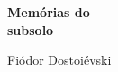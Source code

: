 
\begingroup\thispagestyle{empty}\vspace*{.05\textheight}

              \formular
              \Huge
              \noindent
              \textbf{Memórias do\\subsolo}
    
              {\brabo\LARGE
              \noindent Fiódor Dostoiévski}

\endgroup
\vfill
\pagebreak
